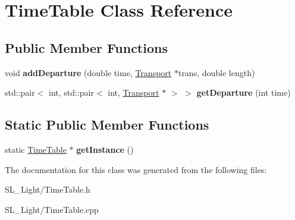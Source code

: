 \hypertarget{class_time_table}{}\section{Time\+Table Class Reference}
\label{class_time_table}
\subsection*{Public Member Functions}
\begin{DoxyCompactItemize}
\item 
\mbox{\label{class_time_table_ae08bf5f8aeab87d8229571b1e875e2f9}} 
void {\bfseries add\+Departure} (double time, \mbox{\hyperlink{class_transport}{Transport}} $\ast$trans, double length)
\item 
\mbox{\label{class_time_table_a82855b9441efb042f0450be066268fa1}} 
std\+::pair$<$ int, std\+::pair$<$ int, \mbox{\hyperlink{class_transport}{Transport}} $\ast$ $>$ $>$ {\bfseries get\+Departure} (int time)
\end{DoxyCompactItemize}
\subsection*{Static Public Member Functions}
\begin{DoxyCompactItemize}
\item 
\mbox{\label{class_time_table_a056d4bdc6c439e719116254093b4b41f}} 
static \mbox{\hyperlink{class_time_table}{Time\+Table}} $\ast$ {\bfseries get\+Instance} ()
\end{DoxyCompactItemize}


The documentation for this class was generated from the following files\+:\begin{DoxyCompactItemize}
\item 
S\+L\+\_\+\+Light/Time\+Table.\+h\item 
S\+L\+\_\+\+Light/Time\+Table.\+cpp\end{DoxyCompactItemize}
